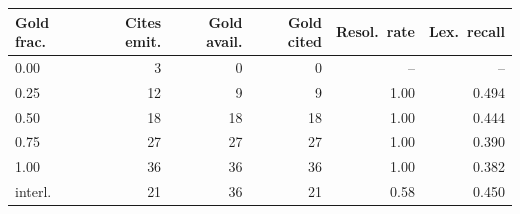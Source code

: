 \begin{tabular}{lrrrrr}
\toprule
Gold frac. & Cites emit. & Gold avail. & Gold cited & Resol.\ rate & Lex.\ recall\\
\midrule
0.00 & 3 & 0 & 0 & -- & --\\
0.25 & 12 & 9 & 9 & 1.00 & 0.494\\
0.50 & 18 & 18 & 18 & 1.00 & 0.444\\
0.75 & 27 & 27 & 27 & 1.00 & 0.390\\
1.00 & 36 & 36 & 36 & 1.00 & 0.382\\
interl. & 21 & 36 & 21 & 0.58 & 0.450\\
\bottomrule
\end{tabular}
